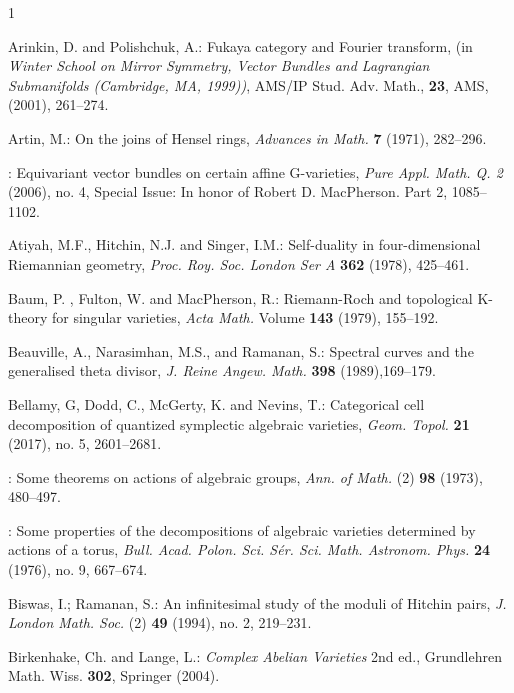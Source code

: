 \documentclass[12pt]{article}
\numberwithin{equation}{section}
\theoremstyle{remark}
\theoremstyle{definition}
\numberwithin{theorem}{section}
\renewcommand{\1}{\mathbbm{1}}
\begin{document}
	
\begin{thebibliography}{1}
	
	

 {\sc Arinkin, D. {\rm and} Polishchuk, A.}:
Fukaya category and Fourier transform,  (in {\em Winter School on Mirror Symmetry, Vector Bundles and Lagrangian Submanifolds (Cambridge, MA, 1999))}, 
AMS/IP Stud. Adv. Math., {\bf 23}, AMS,  (2001), 261--274.

 {\sc Artin, M.}: On the joins of Hensel rings,
{\em Advances in Math. } {\bf 7} (1971), 282--296.


:
Equivariant vector bundles on certain affine G-varieties,  
{\em Pure Appl. Math. Q. 2} (2006), no. 4, Special Issue: In honor of Robert D. MacPherson. Part 2, 1085--1102.
	
	{\sc Atiyah, M.F., Hitchin, N.J.  {\rm and} Singer, I.M.}:
	{ Self-duality in four-dimensional Riemannian geometry}, {\em Proc. Roy. Soc. London Ser A} {\bf 362} (1978), 425--461.
	
	 {\sc Baum, P. , Fulton, W. {\rm and} MacPherson, R.}: Riemann-Roch and topological K-theory for singular varieties, 
{\em	Acta Math.}
	Volume {\bf 143} (1979), 155--192.
	
	  {\sc Beauville, A., Narasimhan, M.S., {\rm and} Ramanan, S.}: Spectral curves and the generalised theta divisor,
	{\em J. Reine  Angew. Math.} {\bf 398} (1989),169--179.
	
	 {\sc Bellamy, G, Dodd, C., McGerty, K. {\rm and} Nevins, T.}:
	Categorical cell decomposition of quantized symplectic algebraic varieties, 
	{\em Geom. Topol.} {\bf 21 }(2017), no. 5, 2601--2681.
	
:
	Some theorems on actions of algebraic groups,
	{\em Ann. of Math.} ({2}) {\bf 98} (1973), 480--497.
	
: Some properties of the decompositions of algebraic varieties determined by actions of a torus, {\em Bull. Acad. Polon. Sci. Sér. Sci. Math. Astronom. Phys.} {\bf 24} (1976), no. 9, 667--674.
	
	{\sc Biswas, I.; Ramanan, S.}: An infinitesimal study of the moduli of Hitchin pairs, {\em J. London Math. Soc.} (2) {\bf 49} (1994), no. 2, 219--231.
	
	 {\sc Birkenhake, Ch.  {\rm and} Lange, L.}: {\em Complex Abelian Varieties} 2nd ed., Grundlehren
	Math. Wiss. {\bf 302}, Springer (2004).
	

\end{thebibliography}
\end{document}
